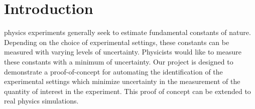 \documentclass[10pt,journal,compsoc]{IEEEtran}
\begin{document}
\ifCLASSOPTIONcompsoc
{}
\else
\section{Introduction}
\label{sec:introduction}
\fi




% 
% 
% 
% 
 physics experiments generally seek to estimate fundamental constants of nature. Depending on the choice of experimental settings, these constants can be measured with varying levels of uncertainty. Physicists would like to measure these constants with a minimum of uncertainty. Our project is designed to demonstrate a proof-of-concept for automating the identification of the experimental settings which minimize uncertainty in the measurement of the quantity of interest in the experiment. This proof of concept can be extended to real physics simulations.
\end{document}
